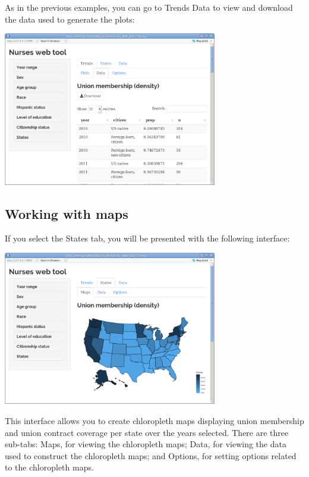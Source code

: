 \documentclass[letterpaper,12pt]{article}
\begin{document}
\begin{enumerate}
  As in the previous examples, you can go to Trends \textrightarrow{}
  Data to view and download the data used to generate the plots:
  \begin{center}
    \includegraphics[width=0.7\textwidth]{images/trends_ex3/data_interface.png}
  \end{center}

\end{enumerate}

\subsection{Working with maps}

If you select the States tab, you will be presented with the following
interface:
\begin{center}
  \includegraphics[width=0.7\textwidth]{images/states_interface.png}
\end{center}
This interface allows you to create chloropleth maps displaying union
membership and union contract coverage per state over the years
selected. There are three sub-tabs: Maps, for viewing the chloropleth
maps; Data, for viewing the data used to construct the chloropleth
maps; and Options, for setting options related to the chloropleth
maps.
\end{document}

